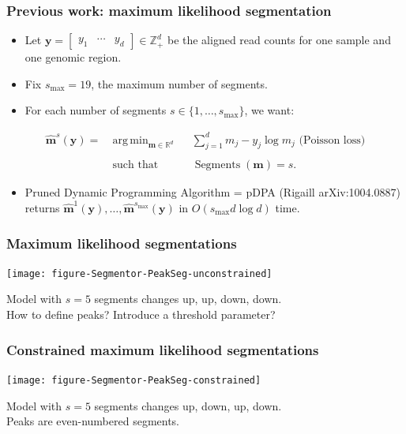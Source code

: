 \documentclass{beamer}
\DeclareMathOperator*{\argmin}{arg\,min}
\DeclareMathOperator*{\Lik}{Lik}
\DeclareMathOperator*{\Segments}{Segments}
\newcommand{\RR}{\mathbb R}
\newcommand{\ZZ}{\mathbb Z}
\begin{document}
\begin{frame}
  \frametitle{Previous work: maximum likelihood segmentation}
  \begin{itemize}
  \item   Let $\mathbf y = 
\left[
  \begin{array}{ccc}
    y_1 & \cdots & y_d
  \end{array}
\right]
\in\ZZ_+^d$ be the aligned read counts for one sample
  and one genomic region.
\item Fix $s_{\text{max}}=19$, the maximum number of segments.
\item For each number of segments $s\in\{1, \dots,
  s_{\text{max}}\}$, we want:
  \end{itemize}
  \begin{equation*}
    \label{argmax:M}
    \begin{aligned}
      \mathbf{\hat m}^s(\mathbf y)  =\ 
      &\argmin_{\mathbf m\in\RR^{d}} && \sum_{j=1}^d
      m_j - y_j \log m_j \text{ (Poisson loss)}
      \\
      \\
      &\text{such that} && \Segments(\mathbf m)=s.
    \end{aligned}
  \end{equation*}
  \begin{itemize}
  \item Pruned Dynamic Programming Algorithm = pDPA (Rigaill
    arXiv:1004.0887) returns $\mathbf{\hat m}^1(\mathbf y), \dots,
    \mathbf{\hat m}^{s_{\text{max}}}(\mathbf y)$ in $O(s_{\text{max}}
    d\log d)$ time.
  \end{itemize}
\end{frame}

\begin{frame}
  \frametitle{Maximum likelihood segmentations}
  \texttt{[image: figure-Segmentor-PeakSeg-unconstrained]}
  
  Model with $s=5$ segments changes up, up, down, down.\\
  How to define peaks? Introduce a threshold parameter?
\end{frame}

\begin{frame}
  \frametitle{Constrained maximum likelihood segmentations}
  \texttt{[image: figure-Segmentor-PeakSeg-constrained]}

  Model with $s=5$ segments changes up, down, up, down.\\
  Peaks are even-numbered segments.
\end{frame}
\end{document}
